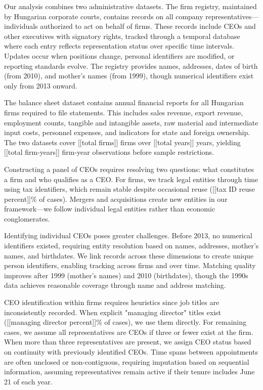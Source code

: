 \documentclass[11pt,a4paper]{article}
\begin{document}
Our analysis combines two administrative datasets. The firm registry, maintained by Hungarian corporate courts, contains records on all company representatives—individuals authorized to act on behalf of firms. These records include CEOs and other executives with signatory rights, tracked through a temporal database where each entry reflects representation status over specific time intervals. Updates occur when positions change, personal identifiers are modified, or reporting standards evolve. The registry provides names, addresses, dates of birth (from 2010), and mother's names (from 1999), though numerical identifiers exist only from 2013 onward.

The balance sheet dataset contains annual financial reports for all Hungarian firms required to file statements. This includes sales revenue, export revenue, employment counts, tangible and intangible assets, raw material and intermediate input costs, personnel expenses, and indicators for state and foreign ownership. The two datasets cover [[total firms]] firms over [[total years]] years, yielding [[total firm-years]] firm-year observations before sample restrictions.

Constructing a panel of CEOs requires resolving two questions: what constitutes a firm and who qualifies as a CEO. For firms, we track legal entities through time using tax identifiers, which remain stable despite occasional reuse ([[tax ID reuse percent]]\% of cases). Mergers and acquisitions create new entities in our framework—we follow individual legal entities rather than economic conglomerates.

Identifying individual CEOs poses greater challenges. Before 2013, no numerical identifiers existed, requiring entity resolution based on names, addresses, mother's names, and birthdates. We link records across these dimensions to create unique person identifiers, enabling tracking across firms and over time. Matching quality improves after 1999 (mother's names) and 2010 (birthdates), though the 1990s data achieves reasonable coverage through name and address matching.

CEO identification within firms requires heuristics since job titles are inconsistently recorded. When explicit "managing director" titles exist ([[managing director percent]]\% of cases), we use them directly. For remaining cases, we assume all representatives are CEOs if three or fewer exist at the firm. When more than three representatives are present, we assign CEO status based on continuity with previously identified CEOs. Time spans between appointments are often unclosed or non-contiguous, requiring imputation based on sequential information, assuming representatives remain active if their tenure includes June 21 of each year.
\end{document}
